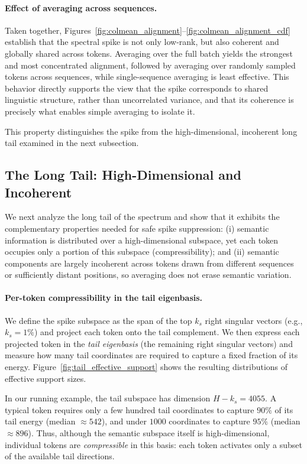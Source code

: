\paragraph{Effect of averaging across sequences.}
Taken together, Figures~\ref{fig:colmean_alignment}--\ref{fig:colmean_alignment_cdf}
establish that the spectral spike is not only low-rank, but also coherent and
globally shared across tokens.
Averaging over the full batch yields the strongest and most concentrated
alignment, followed by averaging over randomly sampled tokens across sequences,
while single-sequence averaging is least effective.
This behavior directly supports the view that the spike corresponds to shared
linguistic structure, rather than uncorrelated variance, and that its coherence
is precisely what enables simple averaging to isolate it.

This property distinguishes the spike from the high-dimensional, incoherent long
tail examined in the next subsection.

\subsection{The Long Tail: High-Dimensional and Incoherent}
\label{subsec:tail_incoherent}

We next analyze the long tail of the spectrum and show that it exhibits the
complementary properties needed for safe spike suppression:
(i) semantic information is distributed over a high-dimensional subspace, yet
each token occupies only a portion of this subspace (compressibility); and
(ii) semantic components are largely incoherent across tokens drawn from
different sequences or sufficiently distant positions, so averaging does not
erase semantic variation.

\paragraph{Per-token compressibility in the tail eigenbasis.}
We define the spike subspace as the span of the top $k_s$ right singular vectors
(e.g., $k_s=1\%$) and project each token onto the tail complement.
We then express each projected token in the \emph{tail eigenbasis} (the remaining
right singular vectors) and measure how many tail coordinates are required to
capture a fixed fraction of its energy.
Figure~\ref{fig:tail_effective_support} shows the resulting distributions of
effective support sizes.

In our running example, the tail subspace has dimension $H-k_s=4055$.
A typical token requires only a few hundred tail coordinates to capture
$90\%$ of its tail energy (median $\approx 542$), and under $1000$ coordinates to
capture $95\%$ (median $\approx 896$).
Thus, although the semantic subspace itself is high-dimensional, individual
tokens are \emph{compressible} in this basis: each token activates only a subset
of the available tail directions.

